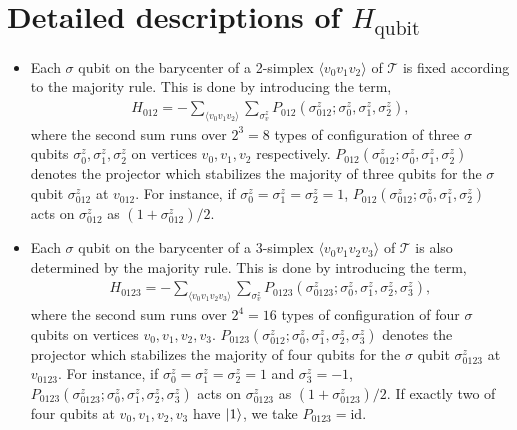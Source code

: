 \documentclass[12pt]{article}
\numberwithin{equation}{section}
\begin{document}
\section{Detailed descriptions of $H_{\mathrm{qubit}}$}
\label{app:hqubit}

\begin{itemize}
    \item Each $\sigma$ qubit on the barycenter of a 2-simplex $\langle v_0v_1v_2\rangle$ of $\mathcal{T}$ is fixed according to the majority rule.
    This is done by introducing the term,
    \begin{align}
        H_{012}=-\sum_{\langle v_0v_1v_2\rangle}\sum_{\sigma_v^z}P_{012}(\sigma^z_{012}; \sigma^z_{0}, \sigma^z_{1}, \sigma^z_{2}),
    \end{align}
    where the second sum runs over $2^3=8$ types of configuration of three $\sigma$ qubits $\sigma^z_0, \sigma^z_1, \sigma^z_2$ on vertices $v_0,v_1,v_2$ respectively. $P_{012}(\sigma^z_{012}; \sigma^z_{0}, \sigma^z_{1}, \sigma^z_{2})$ denotes the projector which stabilizes the majority of three qubits for the $\sigma$ qubit $\sigma^z_{012}$ at $v_{012}$. 
    For instance, if $\sigma^z_{0}=\sigma^z_{1}=\sigma^z_{2}=1$, $P_{012}(\sigma^z_{012}; \sigma^z_{0}, \sigma^z_{1}, \sigma^z_{2})$ acts on $\sigma^z_{012}$ as $(1+\sigma^z_{012})/2$. 
    
    \item Each $\sigma$ qubit on the barycenter of a 3-simplex $\langle v_0v_1v_2v_3\rangle$ of $\mathcal{T}$ is also determined by the majority rule. 
    This is done by introducing the term,
    \begin{align}
        H_{0123}=-\sum_{\langle v_0v_1v_2v_3\rangle}\sum_{\sigma_v^z}P_{0123}(\sigma^z_{0123}; \sigma^z_{0}, \sigma^z_{1}, \sigma^z_{2}, \sigma^z_{3}),
    \end{align}
    where the second sum runs over $2^4=16$ types of configuration of four $\sigma$ qubits on vertices $v_0,v_1,v_2, v_3$. $P_{0123}(\sigma^z_{012}; \sigma^z_{0}, \sigma^z_{1}, \sigma^z_{2}, \sigma^z_{3})$ denotes the projector which stabilizes the majority of four qubits for the $\sigma$ qubit $\sigma^z_{0123}$ at $v_{0123}$. 
    For instance, if $\sigma^z_{0}=\sigma^z_{1}=\sigma^z_{2}=1$ and  $\sigma^z_3=-1$, $P_{0123}(\sigma^z_{0123}; \sigma^z_{0}, \sigma^z_{1}, \sigma^z_{2}, \sigma^z_{3})$ acts on $\sigma^z_{0123}$ as $(1+\sigma^z_{0123})/2$.
    If exactly two of four qubits at $v_0,v_1,v_2, v_3$ have $\ket{1}$, we take $P_{0123}=\mathrm{id}$.
    

\end{itemize}
\end{document}
